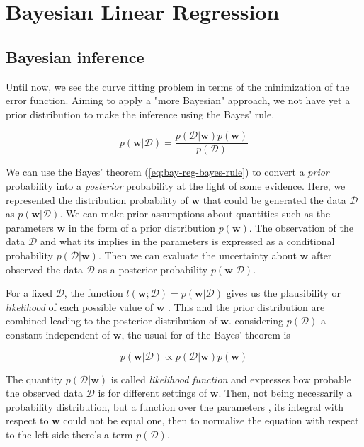 \documentclass[11pt]{article} %
\begin{document}
\section{Bayesian Linear Regression}

\subsection{Bayesian inference}

Until now, we see the curve fitting problem in terms of the minimization of the error function. Aiming to apply a "more Bayesian" approach, we not have yet a prior distribution to make the inference using the Bayes' rule. 

\begin{equation}
   \label{eq:bay-reg-bayes-rule}
   p(\mathbf{w} | \mathcal{D})=\frac{p(\mathcal{D} | \mathbf{w}) p(\mathbf{w})}{p(\mathcal{D})}
\end{equation}

We can use the Bayes' theorem (\ref{eq:bay-reg-bayes-rule}) to convert a \textit{prior} probability into a \textit{posterior} probability at the light of some evidence. Here, we represented the distribution probability of $\mathbf{w}$ that could be generated the data $\mathcal{D}$ as $p(\mathbf{w}|\mathcal{D})$. We can make prior assumptions about quantities such as the parameters $\mathbf{w}$ in the form of a prior distribution $p(\mathbf{w})$. The observation of the data $\mathcal{D}$ and what its implies in the parameters is expressed as a conditional probability $p(\mathcal{D}|\mathbf{w})$. Then we can evaluate the uncertainty about $\mathbf{w}$ after observed the data $\mathcal{D}$ as a posterior probability $p(\mathbf{w}|\mathcal{D})$.

For a fixed $\mathcal{D}$, the function $l(\mathbf{w};\mathcal{D}) = p(\mathbf{w}|\mathcal{D})$ gives us the plausibility or \textit{likelihood} of each possible value of $\mathbf{w}$ \cite{ehlers}. This and the prior distribution are combined leading to the posterior distribution of $\mathbf{w}$. considering $p(\mathcal{D})$ a constant independent of $\mathbf{w}$, the usual for of the Bayes' theorem is

\begin{equation}
   p(\mathbf{w} | \mathcal{D}) \propto p(\mathcal{D} | \mathbf{w}) p(\mathbf{w})
   \label{eq:bayes-ML}
\end{equation}

The quantity $p(\mathcal{D}|\mathbf{w})$ is called \textit{likelihood function} and expresses how probable the observed data $\mathcal{D}$ is for different settings of $\mathbf{w}$. Then, not being necessarily a probability distribution, but a function over the parameters \cite{degroot2012probability}, its integral with respect to $\mathbf{w}$ could not be equal one, then to normalize the equation with respect to the left-side there's a term $p(\mathcal{D})$.
\end{document}
